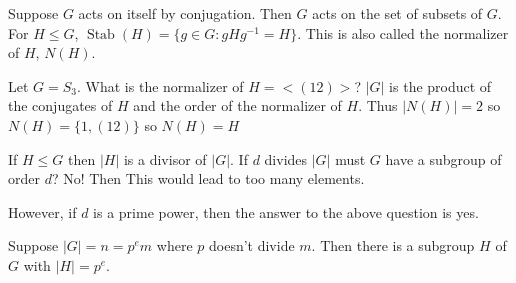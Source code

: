 \documentclass{article}
\DeclareMathOperator{\Stab}{Stab}
\begin{document}
\begin{definition}
Suppose $G$ acts on itself by conjugation. Then $G$ acts on the set of subsets of $G$. For $H\leq G$, $\Stab(H)=\{g\in G:gHg^{-1}=H\}$. This is also called the normalizer of $H$, $N(H)$.
\end{definition}
\begin{example}
Let $G=S_3$. What is the normalizer of $H=<(12)>$? $|G|$ is the product of the conjugates of $H$ and the order of the normalizer of $H$. Thus $|N(H)|=2$ so $N(H)=\{1,(12)\}$ so $N(H)=H$
\end{example}
\begin{theorem}
If $H\leq G$ then $|H|$ is a divisor of $|G|$. If $d$ divides $|G|$ must $G$ have a subgroup of order $d$? No! Then This would lead to too many elements. 
\end{theorem}
However, if $d$ is a prime power, then the answer to the above question is yes.
\begin{theorem}
Suppose $|G|=n=p^em$ where $p$ doesn't divide $m$. Then there is a subgroup $H$ of $G$ with $|H|=p^e$. 
\end{theorem}
\end{document}
